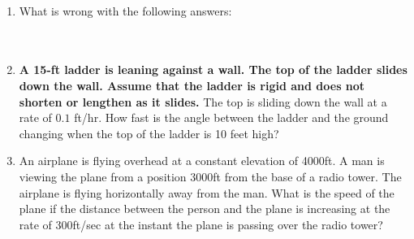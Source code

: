 \documentclass[11pt,fleqn]{article}
\begin{document}
\renewcommand{\headrulewidth}{0pt}
\newcommand{\blank}[1]{\rule{#1}{0.75pt}}
\newcommand{\bc}{\begin{center}}
\newcommand{\ec}{\end{center}}
\renewcommand{\d}{\displaystyle}

\vspace*{-0.7in}

\begin{center}
  \large
  \\
\end{center}
\begin{enumerate}
\item What is wrong with the following answers:\\

\quad {}\\

\quad {}\\

\item \textbf{A 15-ft ladder is leaning against a wall. The top of the ladder slides down the wall. Assume that the ladder is rigid and does not shorten or lengthen as it slides.} The top is sliding down the wall at a rate of $0.1$ ft/hr. How fast is the angle between the ladder and the ground changing when the top of the ladder is 10 feet high?
\vfill
\newpage
\item An airplane is flying overhead at a constant elevation of 4000ft. A man is viewing the plane from a position 3000ft from the base of a radio tower. The airplane is flying horizontally away from the man. What is the speed of the plane if the distance between the person and the plane is increasing at the rate of 300ft/sec at the instant the plane is passing over the radio tower?
\vfill
\end{enumerate}
\end{document}
